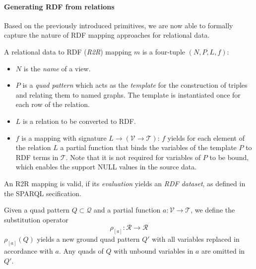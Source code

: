 \paragraph{Generating RDF from relations}
Based on the previously introduced primitives, we are now able to formally
capture the nature of RDF mapping approaches for relational data.

A relational data to RDF (\emph{R2R}) mapping $m$ is a four-tuple $(N, P, L, f)$:
\begin{itemize}
  \item {$N$} is the \emph{name} of a view.
  \item {$P$} is a \emph{quad pattern}
   which acts as the \emph{template} for the construction of triples and
   relating them to named graphs. The template is instantiated once for each row
   of the relation.
  \item {$L$} is a relation to be converted to RDF.
  \item {$f$} is a mapping with signature $L \rightarrow \left( \mathcal{V} \rightarrow \mathcal{T} \right)$:
  $f$ yields for each element of the relation $L$ a partial function that binds
  the variables of the template $P$ to RDF terms in $\mathcal{T}$.
  Note that it is not required for variables of $P$ to be bound, which enables the support NULL values in the source data.
\end{itemize}
An R2R mapping is valid, if its \emph{evaluation} yields an
\emph{RDF dataset}, as defined in the SPARQL
secification.

Given a quad pattern $Q \subset \mathcal{Q}$ and a partial function $a: \mathcal{V} \rightarrow \mathcal{T}$, we define the substitution operator
\[
\mathit{\rho_{[a]}}: \mathcal{R} \rightarrow \mathcal{R}
\]
$\rho_{[a]}(Q)$ yields a new ground quad pattern $Q'$ with all variables replaced in accordance with $a$. Any quads of $Q$ with unbound variables
in $a$ are omitted in $Q'$.

